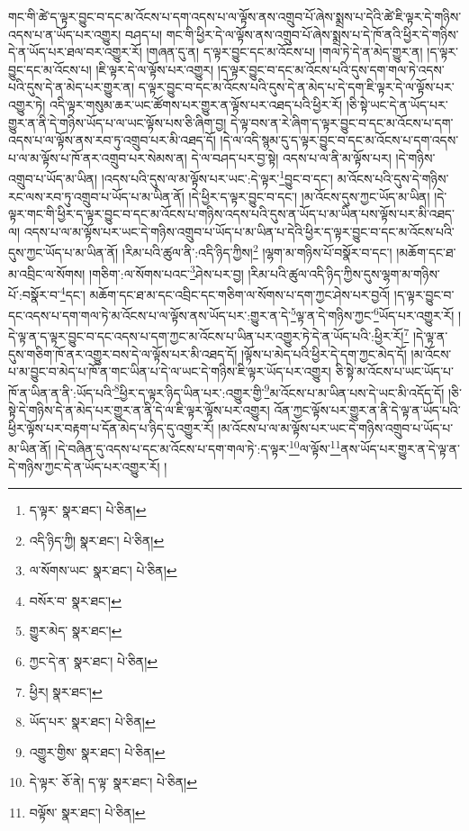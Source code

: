 གང་གི་ཚེ་ད་ལྟར་བྱུང་བ་དང་མ་འོངས་པ་དག་འདས་པ་ལ་ལྟོས་ནས་འགྲུབ་པོ་ཞེས་སྨྲས་པ་དེའི་ཚེ་ཇི་ལྟར་དེ་གཉིས་འདས་པ་ན་ཡོད་པར་འགྱུར། བཤད་པ། གང་གི་ཕྱིར་དེ་ལ་ལྟོས་ནས་འགྲུབ་པོ་ཞེས་སྨྲས་པ་དེ་ཁོ་ནའི་ཕྱིར་དེ་གཉིས་དེ་ན་ཡོད་པར་ཐལ་བར་འགྱུར་རོ། །གཞན་དུ་ན། ད་ལྟར་བྱུང་དང་མ་འོངས་པ། །གལ་ཏེ་དེ་ན་མེད་གྱུར་ན། །ད་ལྟར་བྱུང་དང་མ་འོངས་པ། །ཇི་ལྟར་དེ་ལ་ལྟོས་པར་འགྱུར། །ད་ལྟར་བྱུང་བ་དང་མ་འོངས་པའི་དུས་དག་གལ་ཏེ་འདས་པའི་དུས་དེ་ན་མེད་པར་གྱུར་ན། ད་ལྟར་བྱུང་བ་དང་མ་འོངས་པའི་དུས་དེ་ན་མེད་པ་དེ་དག་ཇི་ལྟར་དེ་ལ་ལྟོས་པར་འགྱུར་ཏེ། འདི་ལྟར་གསུམ་ཆར་ཡང་ཚོགས་པར་གྱུར་ན་ལྟོས་པར་འཐད་པའི་ཕྱིར་རོ། །ཅི་སྟེ་ཡང་དེ་ན་ཡོད་པར་གྱུར་ན་ནི་དེ་གཉིས་ཡོད་པ་ལ་ཡང་ལྟོས་པས་ཅི་ཞིག་བྱ། དེ་ལྟ་བས་ན་རེ་ཞིག་ད་ལྟར་བྱུང་བ་དང་མ་འོངས་པ་དག་འདས་པ་ལ་ལྟོས་ནས་རབ་ཏུ་འགྲུབ་པར་མི་འཐད་དོ། །དེ་ལ་འདི་སྙམ་དུ་ད་ལྟར་བྱུང་བ་དང་མ་འོངས་པ་དག་འདས་པ་ལ་མ་ལྟོས་པ་ཁོ་ནར་འགྲུབ་པར་སེམས་ན། དེ་ལ་བཤད་པར་བྱ་སྟེ། འདས་པ་ལ་ནི་མ་ལྟོས་པར། །དེ་གཉིས་འགྲུབ་པ་ཡོད་མ་ཡིན། །འདས་པའི་དུས་ལ་མ་ལྟོས་པར་ཡང་:དེ་ལྟར་\footnote{ད་ལྟར་  སྣར་ཐང་།  པེ་ཅིན། }བྱུང་བ་དང་། མ་འོངས་པའི་དུས་དེ་གཉིས་རང་ལས་རབ་ཏུ་འགྲུབ་པ་ཡོད་པ་མ་ཡིན་ནོ། །དེ་ཕྱིར་ད་ལྟར་བྱུང་བ་དང་། །མ་འོངས་དུས་ཀྱང་ཡོད་མ་ཡིན། །དེ་ལྟར་གང་གི་ཕྱིར་ད་ལྟར་བྱུང་བ་དང་མ་འོངས་པ་གཉིས་འདས་པའི་དུས་ན་ཡོད་པ་མ་ཡིན་པས་ལྟོས་པར་མི་འཐད་ལ། འདས་པ་ལ་མ་ལྟོས་པར་ཡང་དེ་གཉིས་འགྲུབ་པ་ཡོད་པ་མ་ཡིན་པ་དེའི་ཕྱིར་ད་ལྟར་བྱུང་བ་དང་མ་འོངས་པའི་དུས་ཀྱང་ཡོད་པ་མ་ཡིན་ནོ། །རིམ་པའི་ཚུལ་ནི་:འདི་ཉིད་ཀྱིས།\footnote{འདི་ཉིད་ཀྱི།  སྣར་ཐང་།  པེ་ཅིན། } །ལྷག་མ་གཉིས་པོ་བསྣོར་བ་དང་། །མཆོག་དང་ཐ་མ་འབྲིང་ལ་སོགས། །གཅིག་:ལ་སོགས་པའང་\footnote{ལ་སོགས་ཡང་  སྣར་ཐང་།  པེ་ཅིན། }ཤེས་པར་བྱ། །རིམ་པའི་ཚུལ་འདི་ཉིད་ཀྱིས་དུས་ལྷག་མ་གཉིས་པོ་:བསྣོར་བ་\footnote{བསོར་བ་  སྣར་ཐང་། }དང་། མཆོག་དང་ཐ་མ་དང་འབྲིང་དང་གཅིག་ལ་སོགས་པ་དག་ཀྱང་ཤེས་པར་བྱའོ། །ད་ལྟར་བྱུང་བ་དང་འདས་པ་དག་གལ་ཏེ་མ་འོངས་པ་ལ་ལྟོས་ནས་ཡོད་པར་:གྱུར་ན་དེ་\footnote{གྱུར་མེད་  སྣར་ཐང་། }ལྟ་ན་དེ་གཉིས་ཀྱང་\footnote{ཀྱང་དེ་ན་  སྣར་ཐང་།  པེ་ཅིན། }ཡོད་པར་འགྱུར་རོ། །དེ་ལྟ་ན་ད་ལྟར་བྱུང་བ་དང་འདས་པ་དག་ཀྱང་མ་འོངས་པ་ཡིན་པར་འགྱུར་ཏེ་དེ་ན་ཡོད་པའི་:ཕྱིར་རོ།\footnote{ཕྱིར།  སྣར་ཐང་། } །དེ་ལྟ་ན་དུས་གཅིག་ཁོ་ནར་འགྱུར་བས་དེ་ལ་ལྟོས་པར་མི་འཐད་དོ། །ལྟོས་པ་མེད་པའི་ཕྱིར་དེ་དག་ཀྱང་མེད་དོ། །མ་འོངས་པ་མ་བྱུང་བ་མེད་པ་ཁོ་ན་གང་ཡིན་པ་དེ་ལ་ཡང་དེ་གཉིས་ཇི་ལྟར་ཡོད་པར་འགྱུར། ཅི་སྟེ་མ་འོངས་པ་ཡང་ཡོད་པ་ཁོ་ན་ཡིན་ན་ནི་:ཡོད་པའི་\footnote{ཡོད་པར་  སྣར་ཐང་།  པེ་ཅིན། }ཕྱིར་ད་ལྟར་ཉིད་ཡིན་པར་:འགྱུར་གྱི་\footnote{འགྱུར་གྱིས་  སྣར་ཐང་།  པེ་ཅིན། }མ་འོངས་པ་མ་ཡིན་པས་དེ་ཡང་མི་འདོད་དོ། །ཅི་སྟེ་དེ་གཉིས་དེ་ན་མེད་པར་གྱུར་ན་ནི་དེ་ལ་ཇི་ལྟར་ལྟོས་པར་འགྱུར། འོན་ཀྱང་ལྟོས་པར་གྱུར་ན་ནི་དེ་ལྟ་ན་ཡོད་པའི་ཕྱིར་ལྟོས་པར་བརྟག་པ་དོན་མེད་པ་ཉིད་དུ་འགྱུར་རོ། །མ་འོངས་པ་ལ་མ་ལྟོས་པར་ཡང་དེ་གཉིས་འགྲུབ་པ་ཡོད་པ་མ་ཡིན་ནོ། །དེ་བཞིན་དུ་འདས་པ་དང་མ་འོངས་པ་དག་གལ་ཏེ་:ད་ལྟར་\footnote{དེ་ལྟར་  ཅོ་ནེ། ད་ལྟ་  སྣར་ཐང་།  པེ་ཅིན། }ལ་ལྟོས་\footnote{བལྟོས་  སྣར་ཐང་།  པེ་ཅིན། }ནས་ཡོད་པར་གྱུར་ན་དེ་ལྟ་ན་དེ་གཉིས་ཀྱང་དེ་ན་ཡོད་པར་འགྱུར་རོ། །
